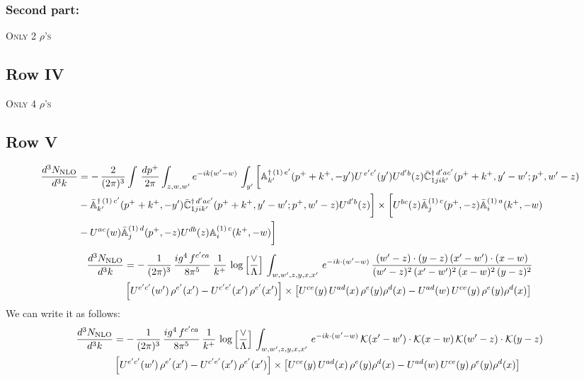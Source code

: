 \documentclass[9pt]{article}
\def\mf#1{\mathbb{#1}}
\numberwithin{equation}{section}
\begin{document}
\subsubsection{Second part:}
\textsc{Only 2 $\rho$'s}
\subsection{Row IV}
\textsc{Only 4 $\rho$'s}
\subsection{Row V}
\begin{align}
 \frac{d^{3}N_{\rm NLO}}{d^{3}k} & =   -\,\frac{2}{(2\pi)^{3}} \int\, \frac{dp^{+}}{2\pi}\int_{z,w,w^{\prime}} e^{-ik(w^{\prime}-w)}\,\int_{y^{\prime}}\bigg[\mf{A}^{\dagger\, (1)\,e^{\prime}}_{k^{\prime}}(p^{+}+k^{+},-y^{\prime})U^{\, e^{\prime}c^{\prime}}(y^{\prime})U^{d^{\prime}b}(z) \Bar{\mf{C}}^{\dagger\, d^{\prime}ac^{\prime}}_{1jik^{\prime}}(p^{+}+k^{+},y^{\prime}-w^{\prime}; p^{+},w^{\prime}-z) \notag \\ & -\Bar{\mf{A}}^{\dagger\, (1)\,c^{\prime}}_{k^{\prime}}(p^{+}+k^{+},-y^{\prime}) \Bar{\mf{C}}^{\dagger\, d^{\prime}ac^{\prime}}_{1jik^{\prime}}(p^{+}+k^{+},y^{\prime}-w^{\prime}; p^{+},w^{\prime}-z)U^{d^{\prime}b}(z)\bigg] \times  \bigg[U^{bc}(z)\Bar{\mf{A}}^{(1)\, c}_{j}(p^{+},-z)\Bar{\mf{A}}^{(1)\, a}_{i}(k^{+},-w)\notag \\ & -U^{ac}(w) \Bar{\mf{A}}^{(1)\, d}_{j}(p^{+},-z)U^{db}(z) \mf{A}^{(1)\, c}_{i}(k^{+},- w)\bigg]\nonumber
\end{align}
\begin{align}
 \frac{d^{3}N_{\rm NLO}}{d^{3}k} & =    -\,\frac{1}{(2\pi)^{3}}\, \frac{ig^{4}\,f^{c'ca}}{8\pi^{5}}\, \frac{1}{k^{+}}\,\log{\left[\frac{\vee}{\Lambda}\right]}\, \int_{w,w',z,y,x,x'}\, e^{-ik\cdot (w'-w)}\,\frac{(w'-z)\cdot (y-z)\,(x'-w')\cdot (x-w)}{(w'-z)^{2}\,(x'-w')^{2}\,(x-w)^{2}\,(y-z)^{2}}\notag \\ & \left[U^{e'c'}(w')\,\rho^{e'}(x')-U^{c'e'}(x')\,\rho^{e'}(x')\right]\times  \left[U^{ce}(y)\,U^{ad}(x)\,\rho^{e}(y)\rho^{d}(x)-U^{ad}(w)\,U^{ce}(y)\,\rho^{e}(y)\rho^{d}(x)\right]
\end{align}
We can write it as follows: 
\begin{align}
 \frac{d^{3}N_{\rm NLO}}{d^{3}k} & =    -\,\frac{1}{(2\pi)^{3}}\, \frac{ig^{4}\,f^{c'ca}}{8\pi^{5}}\, \frac{1}{k^{+}}\,\log{\left[\frac{\vee}{\Lambda}\right]}\, \int_{w,w',z,y,x,x'}\, e^{-ik\cdot (w'-w)}\,\mathcal{K}(x'-w')\cdot \mathcal{K}(x-w)\,\mathcal{K}(w'-z)\cdot \mathcal{K}(y-z)\notag \\ & \left[U^{e'c'}(w')\,\rho^{e'}(x')-U^{c'e'}(x')\,\rho^{e'}(x')\right]\times  \left[U^{ce}(y)\,U^{ad}(x)\,\rho^{e}(y)\rho^{d}(x)-U^{ad}(w)\,U^{ce}(y)\,\rho^{e}(y)\rho^{d}(x)\right]
\end{align}
\end{document}
